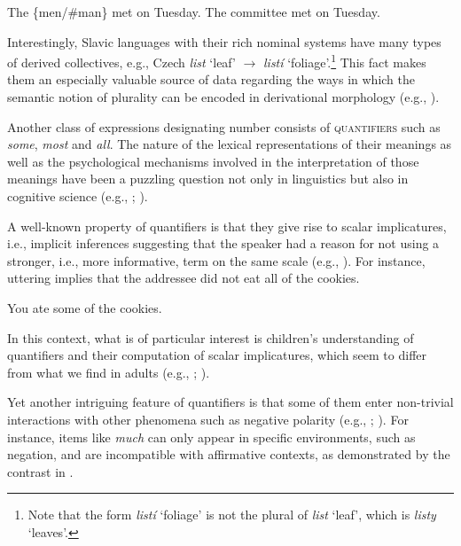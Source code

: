 \documentclass[output=paper]{langscibook}
\begin{document}
\ea\label{doc-wag:ex:collectives}
\ea The \{men/\#man\} met on Tuesday.
\ex The committee met on Tuesday. \hfill \citep[80, adapted]{barker1992group}
\z
\z

\noindent Interestingly, Slavic languages with their rich nominal systems have many types of derived collectives, e.g., Czech \textit{list} `leaf' $\rightarrow$ \textit{listí} `foliage'.\footnote{Note that the form \textit{listí} `foliage' is not the plural of \textit{list} `leaf', which is \textit{listy} `leaves'.} This fact makes them an especially valuable source of data regarding the ways in which the semantic notion of plurality can be encoded in derivational morphology (e.g., ).

Another class of expressions designating number consists of \textsc{quantifiers} such as \textit{some}, \textit{most} and \textit{all}. The nature of the lexical representations of their meanings as well as the psychological mechanisms involved in the interpretation of those meanings have been a puzzling question not only in linguistics but also in cognitive science (e.g., \citealt{pietroski2009meaning, lidz_et-al2011interface}; ).

A well-known property of quantifiers is that they give rise to scalar implicatures, i.e., implicit inferences suggesting that the speaker had a reason for not using a stronger, i.e., more informative, term on the same scale (e.g., \citealt{horn1984toward}). For instance, uttering  implies that the addressee did not eat all of the cookies.

\ea You ate some of the cookies. \hfill \citep[14]{horn1984toward}\label{doc-wag:ex:scalar-implicature}
\z

\noindent In this context, what is of particular interest is children's understanding of quantifiers and their computation of scalar implicatures, which seem to differ from what we find in adults (e.g., \citealt{noveck2001children, papafragou2004children}; ).

Yet another intriguing feature of quantifiers is that some of them enter non-trivial interactions with other phenomena such as negative polarity (e.g., \citealt{isreal1996polarity, solt2015q-adjectives}; ). For instance, items like \textit{much} can only appear in specific environments, such as negation, and are incompatible with affirmative contexts, as demonstrated by the contrast in .
\end{document}

